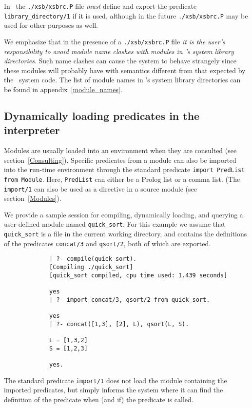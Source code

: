 In \version\ the {\verb|./xsb/xsbrc.P|} file {\em must} define and 
export the predicate {\tt library\_directory/1} if it is used, although
in the future {\verb|./xsb/xsbrc.P|} may be used for other purposes as well.

We emphasize that in the presence of a {\verb|./xsb/xsbrc.P|} file
{\em it is the user's responsibility to avoid module name clashes 
with modules in \ourprolog's system library directories}.
Such name clashes can cause the system to behave strangely since these
modules will probably have with semantics different from that expected
by the \ourprolog\ system code.  The list of module names in
\ourprolog's system library directories can be found in
appendix~\ref{module_names}.


\subsection{Dynamically loading predicates in the interpreter}
Modules are usually loaded into an environment when they are consulted
(see section~\ref{Consulting}).  Specific predicates from a module can
also be imported into the run-time environment through the standard 
predicate {\tt import PredList from Module}.
Here, {\tt PredList} can either be a Prolog list or a comma list.  (The
{\tt import/1} can also be used as a directive in a source module 
(see section~\ref{Modules}).

We provide a sample session for compiling, dynamically loading, and 
querying a user-defined module named {\tt quick\_sort}.
For this example we assume that {\tt quick\_sort} is a file in the 
current working directory, and contains the definitions of the
predicates {\tt concat/3} and {\tt qsort/2}, both of which are exported.

{\footnotesize
\begin{verbatim}
             | ?- compile(quick_sort).
             [Compiling ./quick_sort]
             [quick_sort compiled, cpu time used: 1.439 seconds]

             yes
             | ?- import concat/3, qsort/2 from quick_sort. 

             yes
             | ?- concat([1,3], [2], L), qsort(L, S).

             L = [1,3,2]
             S = [1,2,3]

             yes.
\end{verbatim}
}

The standard predicate {\tt import/1} does not load the module 
containing the imported predicates, but simply informs the system 
where it can find the definition of the predicate when (and if) the
predicate is called.
